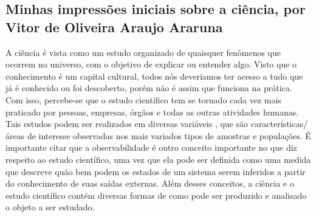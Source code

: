 \subsection{Minhas impressões iniciais sobre a ciência, por Vitor de Oliveira Araujo Araruna}

A ciência é vista como um estudo organizado de quaisquer fenômenos que ocorrem no universo, com o objetivo de explicar ou entender algo. Visto que o conhecimento é um capital cultural, todos nós deveríamos ter acesso a tudo que já é conhecido ou foi descoberto, porém não é assim que funciona na prática. Com isso, percebe-se que o estudo científico tem se tornado cada vez mais praticado por pessoas, empresas, órgãos e todas as outras atividades humanas. Tais estudos podem ser realizados em diversas variáveis \citep{li_variable_2018} , que são características/áreas de interesse observadas nos mais variados tipos de amostras e populações. É importante citar que a observabilidade \citep{arantes_observabilidade_2021} é outro conceito importante no que diz respeito ao estudo científico, uma vez que ela pode ser definida como uma medida que descreve quão bem podem os estados de um sistema serem inferidos a partir do conhecimento de suas saídas externas. Além desses conceitos, a ciência e o estudo científico contém diversas formas de como pode ser produzido e analisado o objeto a ser estudado.

